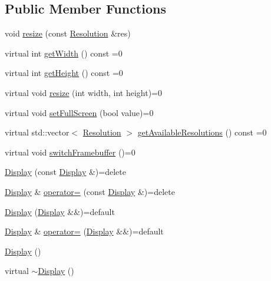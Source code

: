 \subsection*{Public Member Functions}
\begin{DoxyCompactItemize}
\item 
void \hyperlink{classZeta_1_1Display_aa2b1d08b26f25efe5864d950ce3bec61}{resize} (const \hyperlink{classZeta_1_1Display_1_1Resolution}{Resolution} \&res)
\item 
virtual int \hyperlink{classZeta_1_1Display_ac1ac8b765b5bc2589c4f8e01943e41eb}{get\+Width} () const =0
\item 
virtual int \hyperlink{classZeta_1_1Display_ac8b58d29e59ee15c40523dc6661e7c9a}{get\+Height} () const =0
\item 
virtual void \hyperlink{classZeta_1_1Display_a42a19d96e61bac76216071efe61bf8e6}{resize} (int width, int height)=0
\item 
virtual void \hyperlink{classZeta_1_1Display_a07ba98d5a7accc4cad08923e65286912}{set\+Full\+Screen} (bool value)=0
\item 
virtual std\+::vector$<$ \hyperlink{classZeta_1_1Display_1_1Resolution}{Resolution} $>$ \hyperlink{classZeta_1_1Display_ae7ebedea6e6ed113e847e426d6697bb9}{get\+Available\+Resolutions} () const =0
\item 
virtual void \hyperlink{classZeta_1_1Display_a727a7d347a8145029975ec8eef5339d3}{switch\+Framebuffer} ()=0
\item 
\hyperlink{classZeta_1_1Display_a57910f8212688724529fa29b037aa278}{Display} (const \hyperlink{classZeta_1_1Display}{Display} \&)=delete
\item 
\hyperlink{classZeta_1_1Display}{Display} \& \hyperlink{classZeta_1_1Display_ae936382a172e74c4122926862d208b7d}{operator=} (const \hyperlink{classZeta_1_1Display}{Display} \&)=delete
\item 
\hyperlink{classZeta_1_1Display_ada90ecc8f24c9d373a226d64793bfde3}{Display} (\hyperlink{classZeta_1_1Display}{Display} \&\&)=default
\item 
\hyperlink{classZeta_1_1Display}{Display} \& \hyperlink{classZeta_1_1Display_a22b011a76fa73de9f697d78ba1845ea9}{operator=} (\hyperlink{classZeta_1_1Display}{Display} \&\&)=default
\item 
\hyperlink{classZeta_1_1Display_a8908c7b5af77a9ac397e02576da8a78a}{Display} ()
\item 
virtual \hyperlink{classZeta_1_1Display_a92108116b5647ceed7e2aecb97518d01}{$\sim$\+Display} ()
\end{DoxyCompactItemize}
